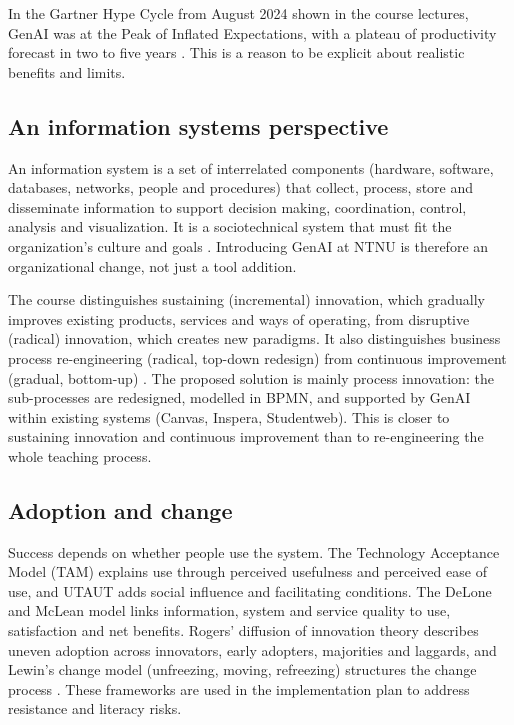 In the Gartner Hype Cycle from August 2024 shown in the course lectures, GenAI was at the Peak of Inflated Expectations, with a plateau of productivity forecast in two to five years \parencite{toussaint2025}. This is a reason to be explicit about realistic benefits and limits.

\subsection{An information systems perspective}

An information system is a set of interrelated components (hardware, software, databases, networks, people and procedures) that collect, process, store and disseminate information to support decision making, coordination, control, analysis and visualization. It is a sociotechnical system that must fit the organization's culture and goals \parencite{toussaint2025}. Introducing GenAI at NTNU is therefore an organizational change, not just a tool addition.

The course distinguishes sustaining (incremental) innovation, which gradually improves existing products, services and ways of operating, from disruptive (radical) innovation, which creates new paradigms. It also distinguishes business process re-engineering (radical, top-down redesign) from continuous improvement (gradual, bottom-up) \parencite{toussaint2025}. The proposed solution is mainly process innovation: the sub-processes are redesigned, modelled in BPMN, and supported by GenAI within existing systems (Canvas, Inspera, Studentweb). This is closer to sustaining innovation and continuous improvement than to re-engineering the whole teaching process.

\subsection{Adoption and change}

Success depends on whether people use the system. The Technology Acceptance Model (TAM) explains use through perceived usefulness and perceived ease of use, and UTAUT adds social influence and facilitating conditions. The DeLone and McLean model links information, system and service quality to use, satisfaction and net benefits. Rogers' diffusion of innovation theory describes uneven adoption across innovators, early adopters, majorities and laggards, and Lewin's change model (unfreezing, moving, refreezing) structures the change process \parencite{stair,toussaint2025}. These frameworks are used in the implementation plan to address resistance and literacy risks.
